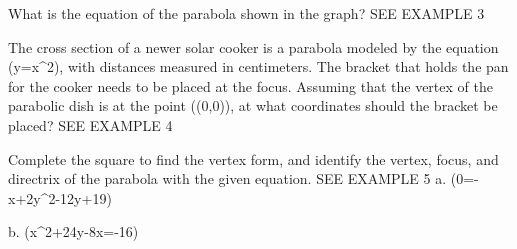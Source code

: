 \documentclass{article}
\newenvironment{practice}[2]{}{}        %
\newcommand{\answer}[1]{}               %
\newcommand{\placeholder}[2]{}          %
\newcommand{\te}[1]{}                   %
\begin{document}
\begin{practice}{19}{1}
What is the equation of the parabola shown in the graph? SEE EXAMPLE 3
\placeholder{graph}{Square grid with spacing 2, window [-10,10] on x and y axes; labels -8,-4,4,8, O at origin, black double-arrow axes x and y. Red downward-opening parabola y=-x^2/32, vertex (0,0), arrowheads at ends near (+/-10,-3.125), red filled focus (0,-8) labeled F.}
\answer{(y=-\frac{1}{32}x^2)}
\end{practice}
\begin{practice}{20}{2}
The cross section of a newer solar cooker is a parabola modeled by the equation (y=x^2), with distances measured in centimeters. The bracket that holds the pan for the cooker needs to be placed at the focus. Assuming that the vertex of the parabolic dish is at the point ((0,0)), at what coordinates should the bracket be placed? SEE EXAMPLE 4
\answer{((0,40))}
\end{practice}
\begin{practice}{21}{2}
Complete the square to find the vertex form, and identify the vertex, focus, and directrix of the parabola with the given equation. SEE EXAMPLE 5
a. (0=-x+2y^2-12y+19)
\answer{vertex ((1,3)); focus ((\frac{9}{8},3)); directrix: (x=\frac{7}{8})}
b. (x^2+24y-8x=-16)
\answer{vertex ((4,0)); focus ((4,-6)); directrix (y=6)}
\te{Printed answer lists the vertex, focus, and directrix, but omits the requested vertex-form equations.}
\end{practice}
\end{document}
